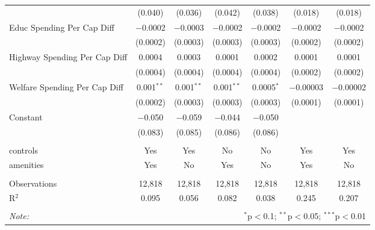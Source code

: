 \begin{table}[!htbp]
\begin{tabular}{@{\extracolsep{5pt}}lcccccc}
  & (0.040) & (0.036) & (0.042) & (0.038) & (0.018) & (0.018) \\ 
  Educ Spending Per Cap Diff & $-$0.0002 & $-$0.0003 & $-$0.0002 & $-$0.0002 & $-$0.0002 & $-$0.0002 \\ 
  & (0.0002) & (0.0003) & (0.0003) & (0.0003) & (0.0002) & (0.0002) \\ 
  Highway Spending Per Cap Diff & 0.0004 & 0.0003 & 0.0001 & 0.0002 & 0.0001 & 0.0001 \\ 
  & (0.0004) & (0.0004) & (0.0004) & (0.0004) & (0.0002) & (0.0002) \\ 
  Welfare Spending Per Cap Diff & 0.001$^{**}$ & 0.001$^{**}$ & 0.001$^{**}$ & 0.0005$^{*}$ & $-$0.00003 & $-$0.00002 \\ 
  & (0.0002) & (0.0003) & (0.0003) & (0.0003) & (0.0001) & (0.0001) \\ 
  Constant & $-$0.050 & $-$0.059 & $-$0.044 & $-$0.050 &  &  \\ 
  & (0.083) & (0.085) & (0.086) & (0.086) &  &  \\ 
 \hline \\[-1.8ex] 
controls & Yes & Yes & No & No & Yes & Yes \\ 
amenities & Yes & No & Yes & No & Yes & No \\ 
\hline \\[-1.8ex] 
Observations & 12,818 & 12,818 & 12,818 & 12,818 & 12,818 & 12,818 \\ 
R$^{2}$ & 0.095 & 0.056 & 0.082 & 0.038 & 0.245 & 0.207 \\ 
\hline 
\hline \\[-1.8ex] 
\textit{Note:}  & \multicolumn{6}{r}{$^{*}$p$<$0.1; $^{**}$p$<$0.05; $^{***}$p$<$0.01} \\ 
\end{tabular} 
\end{table} 
